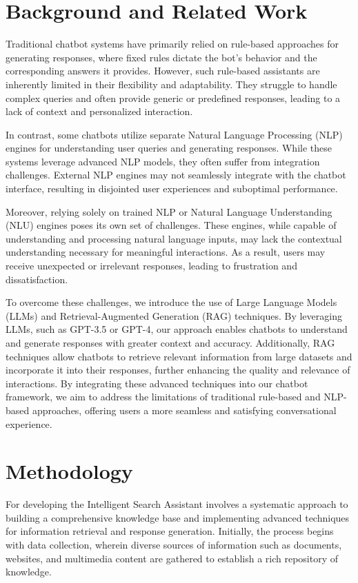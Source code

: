 \documentclass[12pt,a4paper,oneside]{report}
\begin{document}
 
\newpage
\chapter{Background and Related Work}
\hspace{1cm}
Traditional chatbot systems have primarily relied on rule-based approaches for generating responses, where fixed rules dictate the bot's behavior and the corresponding answers it provides. However, such rule-based assistants are inherently limited in their flexibility and adaptability. They struggle to handle complex queries and often provide generic or predefined responses, leading to a lack of context and personalized interaction.


In contrast, some chatbots utilize separate Natural Language Processing (NLP) engines for understanding user queries and generating responses. While these systems leverage advanced NLP models, they often suffer from integration challenges. External NLP engines may not seamlessly integrate with the chatbot interface, resulting in disjointed user experiences and suboptimal performance.

Moreover, relying solely on trained NLP or Natural Language Understanding (NLU) engines poses its own set of challenges. These engines, while capable of understanding and processing natural language inputs, may lack the contextual understanding necessary for meaningful interactions. As a result, users may receive unexpected or irrelevant responses, leading to frustration and dissatisfaction.

To overcome these challenges, we introduce the use of Large Language Models (LLMs) and Retrieval-Augmented Generation (RAG) techniques. By leveraging LLMs, such as GPT-3.5 or GPT-4, our approach enables chatbots to understand and generate responses with greater context and accuracy. Additionally, RAG techniques allow chatbots to retrieve relevant information from large datasets and incorporate it into their responses, further enhancing the quality and relevance of interactions. By integrating these advanced techniques into our chatbot framework, we aim to address the limitations of traditional rule-based and NLP-based approaches, offering users a more seamless and satisfying conversational experience.




\newpage
\chapter{Methodology}
\hspace{1cm}For developing the Intelligent Search Assistant involves a systematic approach to building a comprehensive knowledge base and implementing advanced techniques for information retrieval and response generation. Initially, the process begins with data collection, wherein diverse sources of information such as documents, websites, and multimedia content are gathered to establish a rich repository of knowledge. 
\end{document}
